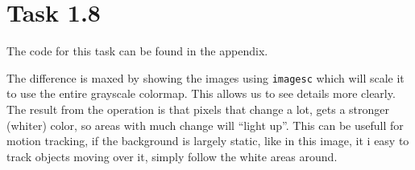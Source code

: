 \section{Task 1.8}
The code for this task can be found in the appendix.


The difference is maxed by showing the images using \texttt{imagesc} which will
scale it to use the entire grayscale colormap. This allows us to see details
more clearly. The result from the operation is that pixels that change a lot,
gets a stronger (whiter) color, so areas with much change will ``light
up''. This can be usefull for motion tracking, if the background is largely
static, like in this image, it i easy to track objects moving over it, simply
follow the white areas around.

